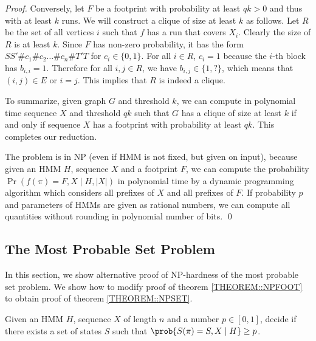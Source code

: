 \begin{proof}
Conversely, let $F$ be a footprint with probability at least $qk>0$
and thus with at least $k$ runs. We will construct a clique of size at
least $k$ as follows. Let $R$ be the set of all vertices $i$ such that
$f$ has a run that covers $X_i$. Clearly the size of $R$ is at least
$k$.  Since $F$ has non-zero probability, it has the form
$SS'\#c_1\#c_2\dots\#c_n\#T'T$ for $c_i\in \{0,1\}$. For all $i\in R$,
$c_i=1$ because the $i$-th block has $b_{i,i}=1$. Therefore for all
$i,j\in R$, we have $b_{i,j}\in \{1,?\}$, which means that $(i,j)\in
E$ or $i=j$. This implies that $R$ is indeed a clique.

To summarize, given graph $G$ and threshold $k$, we can compute in
polynomial time sequence $X$ and threshold $qk$ such that $G$ has a
clique of size at least $k$ if and only if sequence $X$ has a
footprint with probability at least $qk$. This completes our reduction.

The problem is in NP (even if HMM is not fixed, but given on input),
because given an HMM $H$, sequence $X$ and a footprint $F$, we can
compute the probability $\Pr(f(\pi)=F,X\mid H,|X|)$ in polynomial time
by a dynamic programming algorithm which considers all prefixes of
$X$ and all prefixes of $F$. If probability $p$ and parameters of HMMs
are given as rational numbers, we can compute all quantities without
rounding in polynomial number of bits. \qed
\end{proof}

\subsection{The Most Probable Set Problem}
In this section, we show alternative proof of NP-hardness of the most
probable set problem. We show how to modify proof of theorem \ref{THEOREM::NPFOOT}
to obtain proof of theorem \ref{THEOREM::NPSET}.

\begin{definition*} Given an HMM $H$, sequence $X$ of
length $n$ and a number $p\in [0,1]$, decide if there exists a set of states $S$
such that $\prob{S(\pi) = S, X\mid H} \geq p$.
\end{definition*}

